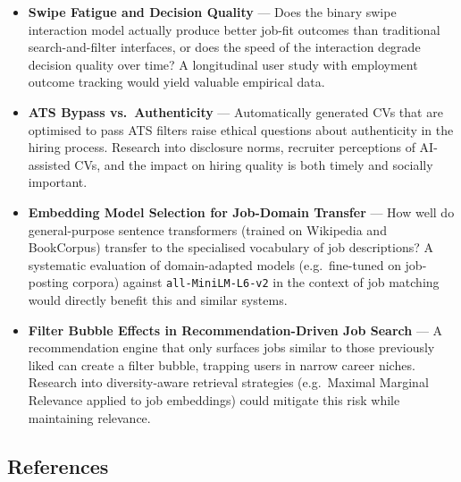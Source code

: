 \documentclass[12pt, a4paper, oneside]{report}
\begin{document}
\begin{itemize}[itemsep=6pt]
  \item \textbf{Swipe Fatigue and Decision Quality} — Does the binary swipe interaction
        model actually produce better job-fit outcomes than traditional search-and-filter
        interfaces, or does the speed of the interaction degrade decision quality over time?
        A longitudinal user study with employment outcome tracking would yield valuable
        empirical data.

  \item \textbf{ATS Bypass vs.\ Authenticity} — Automatically generated CVs that are
        optimised to pass ATS filters raise ethical questions about authenticity in the
        hiring process. Research into disclosure norms, recruiter perceptions of AI-assisted
        CVs, and the impact on hiring quality is both timely and socially important.

  \item \textbf{Embedding Model Selection for Job-Domain Transfer} — How well do
        general-purpose sentence transformers (trained on Wikipedia and BookCorpus) transfer
        to the specialised vocabulary of job descriptions? A systematic evaluation of
        domain-adapted models (e.g.\ fine-tuned on job-posting corpora) against
        \texttt{all-MiniLM-L6-v2} in the context of job matching would directly benefit
        this and similar systems.

  \item \textbf{Filter Bubble Effects in Recommendation-Driven Job Search} — A
        recommendation engine that only surfaces jobs similar to those previously liked can
        create a filter bubble, trapping users in narrow career niches. Research into
        diversity-aware retrieval strategies (e.g.\ Maximal Marginal Relevance applied to
        job embeddings) could mitigate this risk while maintaining relevance.
\end{itemize}

\subsection*{References}
\label{sec:references}
\end{document}
